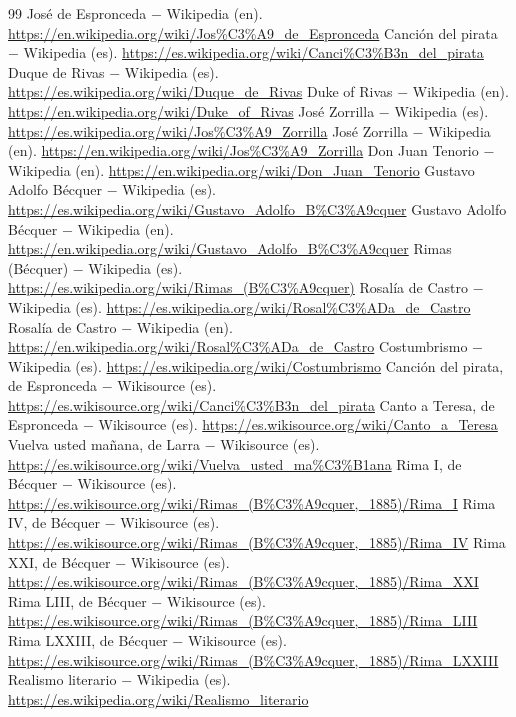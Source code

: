 \documentclass{book}
\begin{document}
\begin{thebibliography}{99}
 José de Espronceda \(-\) Wikipedia (en). \url{https://en.wikipedia.org/wiki/Jos%C3%A9_de_Espronceda}
 Canción del pirata \(-\) Wikipedia (es). \url{https://es.wikipedia.org/wiki/Canci%C3%B3n_del_pirata}
 Duque de Rivas \(-\) Wikipedia (es). \url{https://es.wikipedia.org/wiki/Duque_de_Rivas}
 Duke of Rivas \(-\) Wikipedia (en). \url{https://en.wikipedia.org/wiki/Duke_of_Rivas}
 José Zorrilla \(-\) Wikipedia (es). \url{https://es.wikipedia.org/wiki/Jos%C3%A9_Zorrilla}
 José Zorrilla \(-\) Wikipedia (en). \url{https://en.wikipedia.org/wiki/Jos%C3%A9_Zorrilla}
 Don Juan Tenorio \(-\) Wikipedia (en). \url{https://en.wikipedia.org/wiki/Don_Juan_Tenorio}
 Gustavo Adolfo Bécquer \(-\) Wikipedia (es). \url{https://es.wikipedia.org/wiki/Gustavo_Adolfo_B%C3%A9cquer}
 Gustavo Adolfo Bécquer \(-\) Wikipedia (en). \url{https://en.wikipedia.org/wiki/Gustavo_Adolfo_B%C3%A9cquer}
 Rimas (Bécquer) \(-\) Wikipedia (es). \url{https://es.wikipedia.org/wiki/Rimas_(B%C3%A9cquer)}
 Rosalía de Castro \(-\) Wikipedia (es). \url{https://es.wikipedia.org/wiki/Rosal%C3%ADa_de_Castro}
 Rosalía de Castro \(-\) Wikipedia (en). \url{https://en.wikipedia.org/wiki/Rosal%C3%ADa_de_Castro}
 Costumbrismo \(-\) Wikipedia (es). \url{https://es.wikipedia.org/wiki/Costumbrismo}
 Canción del pirata, de Espronceda \(-\) Wikisource (es). \url{https://es.wikisource.org/wiki/Canci%C3%B3n_del_pirata}
 Canto a Teresa, de Espronceda \(-\) Wikisource (es). \url{https://es.wikisource.org/wiki/Canto_a_Teresa}
 Vuelva usted mañana, de Larra \(-\) Wikisource (es). \url{https://es.wikisource.org/wiki/Vuelva_usted_ma%C3%B1ana}
 Rima I, de Bécquer \(-\) Wikisource (es). \url{https://es.wikisource.org/wiki/Rimas_(B%C3%A9cquer,_1885)/Rima_I}
 Rima IV, de Bécquer \(-\) Wikisource (es). \url{https://es.wikisource.org/wiki/Rimas_(B%C3%A9cquer,_1885)/Rima_IV}
 Rima XXI, de Bécquer \(-\) Wikisource (es). \url{https://es.wikisource.org/wiki/Rimas_(B%C3%A9cquer,_1885)/Rima_XXI}
 Rima LIII, de Bécquer \(-\) Wikisource (es). \url{https://es.wikisource.org/wiki/Rimas_(B%C3%A9cquer,_1885)/Rima_LIII}
 Rima LXXIII, de Bécquer \(-\) Wikisource (es). \url{https://es.wikisource.org/wiki/Rimas_(B%C3%A9cquer,_1885)/Rima_LXXIII}
 Realismo literario \(-\) Wikipedia (es). \url{https://es.wikipedia.org/wiki/Realismo_literario}

\end{thebibliography}
\end{document}
